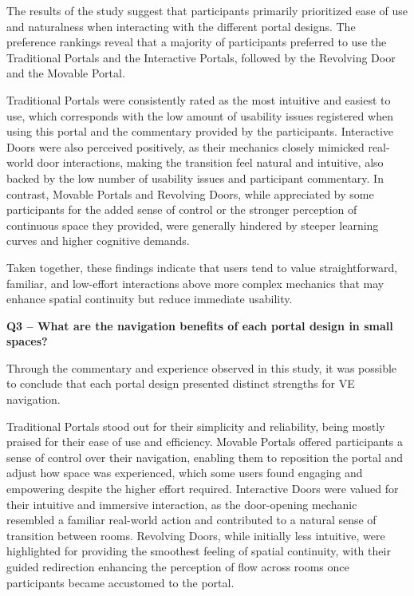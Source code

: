The results of the study suggest that participants primarily prioritized ease of use and naturalness when interacting with the different 
portal designs. The preference rankings reveal that a majority of participants preferred to use the Traditional Portals and the 
Interactive Portals, followed by the Revolving Door and the Movable Portal.

Traditional Portals were consistently rated as the most intuitive and easiest to use, which corresponds with the low amount of usability 
issues registered when using this portal and the commentary provided by the participants. Interactive Doors were also perceived 
positively, as their mechanics closely mimicked real-world door interactions, making the transition feel natural and intuitive, also 
backed by the low number of usability issues and participant commentary. 
In contrast, Movable Portals and Revolving Doors, while appreciated by some participants for the added sense of control or the stronger 
perception of continuous space they provided, were generally hindered by steeper learning curves and higher cognitive demands. 

Taken together, these findings indicate that users tend to value straightforward, familiar, and low-effort interactions above more complex 
mechanics that may enhance spatial continuity but reduce immediate usability. 

\noindent
\textbf{Q3 -- What are the navigation benefits of each portal design in small spaces?} 

Through the commentary and experience observed in this study, it was possible to conclude that each portal design 
presented distinct strengths for \gls{VE} navigation. 

Traditional Portals stood out for their simplicity and reliability, being mostly praised for their ease of use and efficiency. 
Movable Portals offered participants a sense of control over their navigation, enabling them to reposition the portal and adjust 
how space was experienced, which some users found engaging and empowering despite the higher effort required. 
Interactive Doors were valued for their intuitive and immersive interaction, as the door-opening mechanic resembled a 
familiar real-world action and contributed to a natural sense of transition between rooms. 
Revolving Doors, while initially less intuitive, were highlighted for providing the smoothest feeling of spatial continuity, 
with their guided redirection enhancing the perception of flow across rooms once participants became accustomed to the portal.

